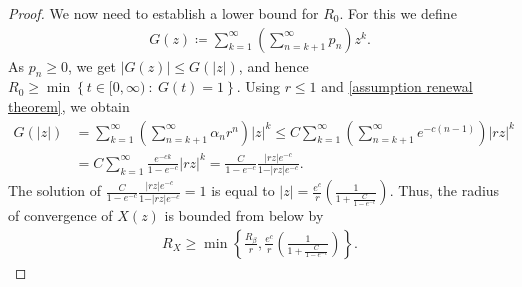 \documentclass[letterpaper, DIV=17]{scrartcl}
\numberwithin{equation}{section}
\theoremstyle{definition}
\begin{document}
\begin{proof}
			We now need to establish a lower bound for $R_0$. For this we define
			\begin{align*}
				G(z) \coloneqq \sum_{k=1}^{\infty} \left(\sum_{n=k+1}^{\infty} p_n\right) z^k.
			\end{align*}
			As $p_n\geq 0$, we get
			$	\vert G(z) \vert \leq G(\vert z\vert) $, and hence
			$
				R_0\geq \min \left\{ t\in [0,\infty) \ : \ G(t) =1 \right\} $. 
			Using $r\leq 1$ and \eqref{assumption renewal theorem}, we obtain
			\begin{align*}
				G(\vert z \vert) 
				&= \sum_{k=1}^{\infty} \left(\sum_{n=k+1}^{\infty} \alpha_n r^n \right) \vert z \vert^k
				\leq  C \sum_{k=1}^{\infty} \left(\sum_{n=k+1}^{\infty} e^{-c(n-1)}\right) \vert rz \vert^k \\
				&=C \sum_{k=1}^\infty \frac{e^{-ck}}{1-e^{-c}} \vert rz \vert^k
				= \frac{C}{1-e^{-c}} \frac{\vert rz\vert e^{-c}}{1-\vert rz\vert e^{-c}}.
			\end{align*}
			The solution of
		$
			\frac{C}{1-e^{-c}} \frac{\vert rz\vert e^{-c}}{1-\vert rz\vert e^{-c}} = 1 $ 
			is equal to
			$
				\vert z \vert = \frac{e^c}{r} \left(\frac{1}{1+\frac{C}{1-e^{-c}}}\right) $. 
			Thus, the radius of convergence of $X(z)$ is bounded from below by
			\begin{align*}
				R_X \geq \min\left\{\frac{R_\beta}{r}, \frac{e^c}{r} \left(\frac{1}{1+\frac{C}{1-e^{-c}}}\right) \right\}.
			\end{align*}
		\end{proof}
		
\end{document}
